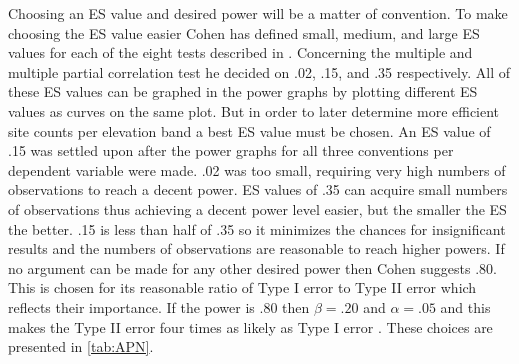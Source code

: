 Choosing an ES value and desired power will be a matter of convention.
To make choosing the ES value easier Cohen has defined small, medium, and large ES values for each of the eight tests described in \citet{cohen1992power}.
Concerning the multiple and multiple partial correlation test he decided on .02, .15, and .35 respectively.
All of these ES values can be graphed in the power graphs by plotting different ES values as curves on the same plot.
But in order to later determine more efficient site counts per elevation band a best ES value must be chosen.
An ES value of .15 was settled upon after the power graphs for all three conventions per dependent variable were made.
.02 was too small, requiring very high numbers of observations to reach a decent power.
ES values of .35 can acquire small numbers of observations thus achieving a decent power level easier, but the smaller the ES the better.
.15 is less than half of .35 so it minimizes the chances for insignificant results and the numbers of observations are reasonable to reach higher powers.
If no argument can be made for any other desired power then Cohen suggests .80.
This is chosen for its reasonable ratio of Type I error to Type II error which reflects their importance.
If the power is .80 then $\beta=.20$ and $\alpha=.05$ and this makes the Type II error four times as likely as Type I error \citep{cohen1992statistical}.
These choices are presented in \autoref{tab:APN}.



